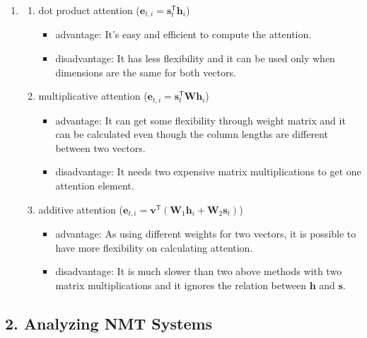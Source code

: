 \documentclass[a4paper]{article}
\begin{document}
\begin{enumerate}[label=(\alph*)]
        \item 
        \begin{enumerate}[label=\roman*.]
            \item dot product attention ($\mathbf{e}_{t,i}=\mathbf{s}_{t}^{\mathsf{T}}\mathbf{h}_{i}$)
            \begin{itemize}
                \item advantage: It's easy and efficient to compute the attention.
                \item disadvantage: It has less flexibility and it can be used only when dimensions are the same for both vectors.
            \end{itemize}

            \item multiplicative attention ($\mathbf{e}_{t,i}=\mathbf{s}_{t}^{\mathsf{T}}\mathbf{W}\mathbf{h}_{i}$)
            \begin{itemize}
                \item advantage: It can get some flexibility through weight matrix and it can be calculated even though the column lengths are different between two vectors.
                \item disadvantage: It needs two expensive matrix multiplications to get one attention element.
            \end{itemize}

            \item additive attention ($\mathbf{e}_{t,i}=\mathbf{v}^{\mathsf{T}}(\mathbf{W}_{1}\mathbf{h}_{i}+\mathbf{W}_{2}\mathbf{s}_{t})$)
            \begin{itemize}
                \item advantage: As using different weights for two vectors, it is possible to have more flexibility on calculating attention.
                \item disadvantage: It is much slower than two above methods with two matrix multiplications and it ignores the relation between $\mathbf{h}$ and $\mathbf{s}$.
            \end{itemize}

        \end{enumerate}
    \end{enumerate}

\subsection*{2. Analyzing NMT Systems}
\end{document}
